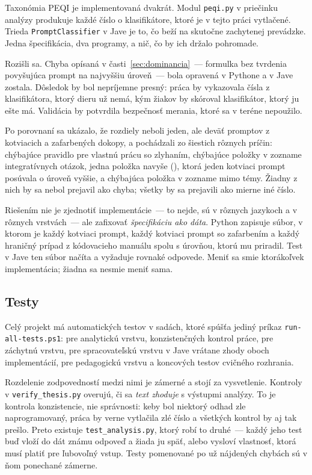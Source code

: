 Taxonómia PEQI je implementovaná dvakrát. Modul \texttt{peqi.py} v priečinku analýzy produkuje každé číslo o klasifikátore, ktoré je v tejto práci vytlačené. Trieda \texttt{PromptClassifier} v Jave je to, čo beží na skutočne zachytenej prevádzke. Jedna špecifikácia, dva programy, a nič, čo by ich držalo pohromade.

Rozišli sa. Chyba opísaná v časti~\ref{sec:dominancia}~--- formulka bez tvrdenia povyšujúca prompt na najvyššiu úroveň~--- bola opravená v Pythone a v Jave zostala. Dôsledok by bol nepríjemne presný: práca by vykazovala čísla z klasifikátora, ktorý dieru už nemá, kým žiakov by skóroval klasifikátor, ktorý ju ešte má. Validácia by potvrdila bezpečnosť merania, ktoré sa v teréne nepoužilo.

Po porovnaní sa ukázalo, že rozdiely neboli jeden, ale deväť promptov z \venN{} kotviacich a zafarbených dokopy, a pochádzali zo šiestich rôznych príčin: chýbajúce pravidlo pre vlastnú prácu so zlyhaním, chýbajúce položky v zozname integratívnych otázok, jedna položka navyše (), ktorá jeden kotviaci prompt posúvala o úroveň vyššie, a chýbajúca položka v zozname mimo témy. Žiadny z nich by sa nebol prejavil ako chyba; všetky by sa prejavili ako mierne iné číslo.

Riešením nie je zjednotiť implementácie~--- to nejde, sú v rôznych jazykoch a v rôznych vrstvách~--- ale zafixovať \emph{špecifikáciu ako dáta}. Python zapisuje súbor, v ktorom je každý kotviaci prompt, každý kotviaci prompt so zafarbením a každý hraničný prípad z kódovacieho manuálu spolu s úrovňou, ktorú mu priradil. Test v Jave ten súbor načíta a vyžaduje rovnaké odpovede. Meniť sa smie ktorákoľvek implementácia; žiadna sa nesmie meniť sama.

\subsection{Testy}
\label{sec:testy}

Celý projekt má \repoTests{} automatických testov v \repoSuites{} sadách, ktoré spúšťa jediný príkaz \texttt{run-all-tests.ps1}: \repoTestsAnalysis{} pre analytickú vrstvu, \repoChecks{} konzistenčných kontrol práce, \repoTestsCapture{} pre záchytnú vrstvu, \repoTestsJava{} pre spracovateľskú vrstvu v Jave vrátane zhody oboch implementácií, \repoTestsPedagogy{} pre pedagogickú vrstvu a \repoTestsClient{} koncových testov cvičného rozhrania.

Rozdelenie zodpovedností medzi nimi je zámerné a stojí za vysvetlenie. Kontroly v \texttt{verify\_thesis.py} overujú, či sa \emph{text zhoduje} s výstupmi analýzy. To je kontrola konzistencie, nie správnosti: keby bol niektorý odhad zle naprogramovaný, práca by verne vytlačila zlé číslo a všetkých \repoChecks{} kontrol by aj tak prešlo. Preto existuje \texttt{test\_analysis.py}, ktorý robí to druhé~--- každý jeho test buď vloží do dát známu odpoveď a žiada ju späť, alebo vysloví vlastnosť, ktorá musí platiť pre ľubovoľný vstup. Testy pomenované po už nájdených chybách sú v ňom ponechané zámerne.

